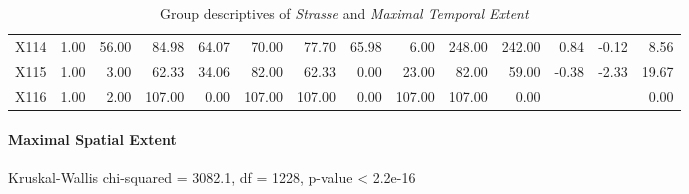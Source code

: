 \begin{table}[ht!]
\begin{tabular}{rrrrrrrrrrrrrr}
    X114 & 1.00 & 56.00 & 84.98 & 64.07 & 70.00 & 77.70 & 65.98 & 6.00 & 248.00 & 242.00 & 0.84 & -0.12 & 8.56 \\ 
    X115 & 1.00 & 3.00 & 62.33 & 34.06 & 82.00 & 62.33 & 0.00 & 23.00 & 82.00 & 59.00 & -0.38 & -2.33 & 19.67 \\ 
    X116 & 1.00 & 2.00 & 107.00 & 0.00 & 107.00 & 107.00 & 0.00 & 107.00 & 107.00 & 0.00 &  &  & 0.00 \\ 
     \hline
  \end{tabular}
	\caption{Group descriptives of \textit{Strasse} and \textit{Maximal Temporal Extent}}
	\label{tbl:descriptives_baysis_matched_Strasse_TMax}
\end{table}

\paragraph{Maximal Spatial Extent}
Kruskal-Wallis chi-squared = 3082.1, df = 1228, p-value < 2.2e-16

